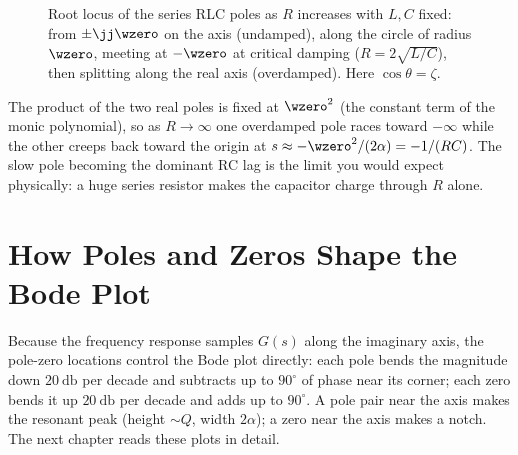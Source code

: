 \begin{figure}[htbp]
\centering
{}
\caption{Root locus of the series RLC poles as \(R\) increases with \(L,C\)
fixed: from \(\pm\jj\wzero\) on the axis (undamped), along the circle of radius
\(\wzero\), meeting at \(-\wzero\) at critical damping (\(R=2\sqrt{L/C}\)), then
splitting along the real axis (overdamped). Here \(\cos\theta=\zeta\).}
\label{fig:rlc-rootlocus}
\end{figure}

\begin{advancedbox}
The product of the two real poles is fixed at \(\wzero^2\) (the constant term of
the monic polynomial), so as \(R\to\infty\) one overdamped pole races toward
\(-\infty\) while the other creeps back toward the origin at
\(s\approx-\wzero^2/(2\alpha)=-1/(RC)\). The slow pole becoming the dominant RC
lag is the limit you would expect physically: a huge series resistor makes the
capacitor charge through \(R\) alone.
\end{advancedbox}

\section{How Poles and Zeros Shape the Bode Plot}
Because the frequency response samples \(G(s)\) along the imaginary axis, the
pole-zero locations control the Bode plot directly: each pole bends the magnitude
down \(\SI{20}{\decibel}\) per decade and subtracts up to \(90^\circ\) of phase
near its corner; each zero bends it up \(\SI{20}{\decibel}\) per decade and adds
up to \(90^\circ\). A pole pair near the axis makes the resonant peak (height
\(\sim Q\), width \(2\alpha\)); a zero near the axis makes a notch. The next
chapter reads these plots in detail.

